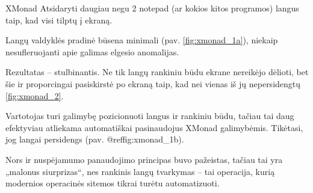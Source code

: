 \begin{xcase}{XMonad}
  \xcgoal
  {
    Atsidaryti daugiau negu 2 notepad (ar kokios kitos programos) langus taip, kad visi 
    tilptų į ekraną.
  }
  
  \xctools
  {
    Langų valdyklės pradinė būsena minimali (pav. \ref{fig:xmonad_1a}), niekaip nesufleruojanti apie galimas elgesio
    anomalijas.
    {
    }
  }
  
  \xcresult
  {
    Rezultatas – stulbinantis. Ne tik langų rankiniu būdu ekrane nereikėjo dėlioti, bet šie
    ir proporcingai pasiskirstė po ekraną taip, kad nei vienas iš jų nepersidengtų \ref{fig:xmonad_2}.
  }
  
  \xcprinciples
  {
    {
      Vartotojas turi galimybę pozicionuoti langus ir rankiniu būdu, tačiau tai daug efektyviau
      atliekama automatiškai pasinaudojus XMonad galimybėmis.
    }
    {
      Tikėtasi, jog langai persidengs (pav. @ref{fig:xmonad_1b}).
    }
  }
  
  \xcthoughts
  {
    Nors ir nuspėjamumo panaudojimo principas buvo pažeistas, tačiau tai yra „malonus 
    siurprizas“, nes rankinis langų tvarkymas – tai operacija, kurią modernios operacinės
    sitemos tikrai turėtu automatizuoti.
  }
\end{xcase}
